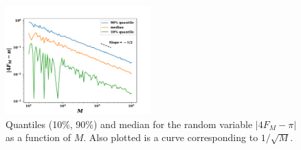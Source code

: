 \documentclass[11pt]{amsart}
\begin{document}
\begin{figure}[htbp]
  \begin{center}
    \includegraphics[width=0.5\textwidth]{images/FM_stats.pdf}
  \end{center}
  \caption{Quantiles (10\%, 90\%) and median for the random variable $\left| 4 F_M - \pi \right|$ as a function of $M$. Also plotted is a curve corresponding to $1/\sqrt{M}$.}\label{fig:FM}
\end{figure}
\end{document}

